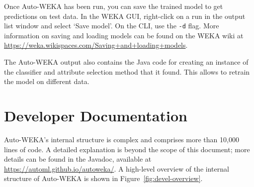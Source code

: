 \documentclass{article}
\begin{document}
Once Auto-WEKA has been run, you can save the trained model to get predictions
on test data. In the WEKA GUI, right-click on a run in the output list window
and select `Save model'. On the CLI, use the \verb=-d= flag. More information on
saving and loading models can be found on the WEKA wiki at
\url{https://weka.wikispaces.com/Saving+and+loading+models}.

The Auto-WEKA output also contains the Java code for creating an instance of the
classifier and attribute selection method that it found. This allows to retrain
the model on different data.

\section{Developer Documentation}

Auto-WEKA's internal structure is complex and comprises more than 10,000 lines
of code. A detailed explanation is beyond the scope of this document; more
details can be found in the Javadoc, available at
\url{https://automl.github.io/autoweka/}. A high-level overview of the internal
structure of Auto-WEKA is shown in Figure~\ref{fig:devel-overview}.
\end{document}
